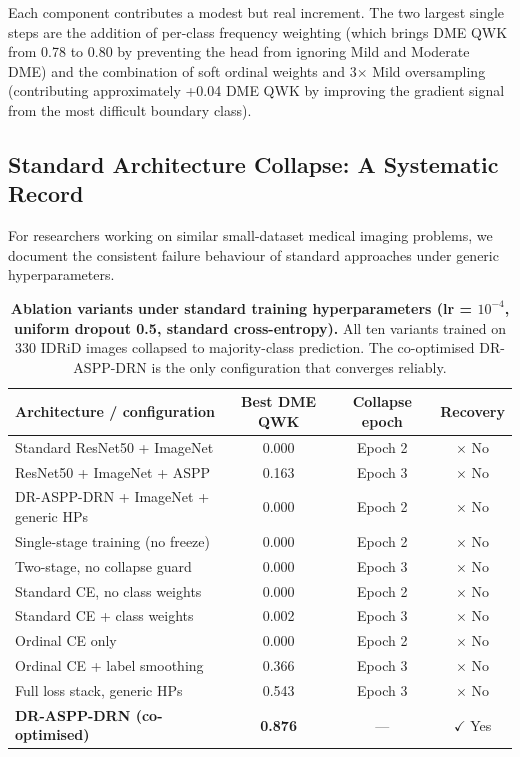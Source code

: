 \documentclass[12pt,a4paper]{article}
\begin{document}
Each component contributes a modest but real increment. The two largest single steps are the addition of per-class frequency weighting (which brings DME QWK from 0.78 to 0.80 by preventing the head from ignoring Mild and Moderate DME) and the combination of soft ordinal weights and 3$\times$ Mild oversampling (contributing approximately +0.04 DME QWK by improving the gradient signal from the most difficult boundary class).
\newpage
\subsection{Standard Architecture Collapse: A Systematic Record}

For researchers working on similar small-dataset medical imaging problems, we document the consistent failure behaviour of standard approaches under generic hyperparameters.

\begin{table}[H]
\centering
{\footnotesize
\caption{\textbf{Ablation variants under standard training hyperparameters (lr = $10^{-4}$, uniform dropout 0.5, standard cross-entropy).} All ten variants trained on 330 IDRiD images collapsed to majority-class prediction. The co-optimised DR-ASPP-DRN is the only configuration that converges reliably.}
\begin{tabular}{|p{5cm}|c|c|c|}
\hline
\textbf{Architecture / configuration} & \textbf{Best DME QWK} & \textbf{Collapse epoch} & \textbf{Recovery} \\
\hline
Standard ResNet50 + ImageNet & 0.000 & Epoch 2 & $\times$ No \\
ResNet50 + ImageNet + ASPP & 0.163 & Epoch 3 & $\times$ No \\
DR-ASPP-DRN + ImageNet + generic HPs & 0.000 & Epoch 2 & $\times$ No \\
Single-stage training (no freeze) & 0.000 & Epoch 2 & $\times$ No \\
Two-stage, no collapse guard & 0.000 & Epoch 3 & $\times$ No \\
Standard CE, no class weights & 0.000 & Epoch 2 & $\times$ No \\
Standard CE + class weights & 0.002 & Epoch 3 & $\times$ No \\
Ordinal CE only & 0.000 & Epoch 2 & $\times$ No \\
Ordinal CE + label smoothing & 0.366 & Epoch 3 & $\times$ No \\
Full loss stack, generic HPs & 0.543 & Epoch 3 & $\times$ No \\
\hline
\textbf{DR-ASPP-DRN (co-optimised)} & \textbf{0.876} & --- & $\checkmark$ Yes \\
\hline
\end{tabular}
}
\end{table}
\end{document}
